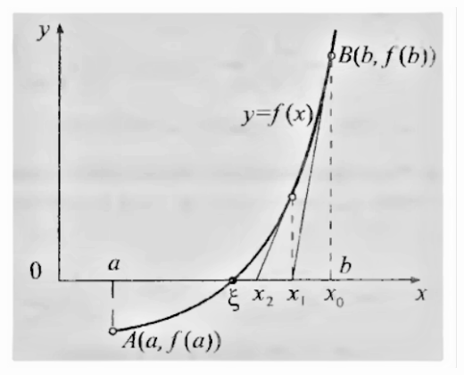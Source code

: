 \documentclass[14pt,a4paper,titlepage]{extarticle}
\begin{document}
{\centering\includegraphics{10}\par}
\end{document}
